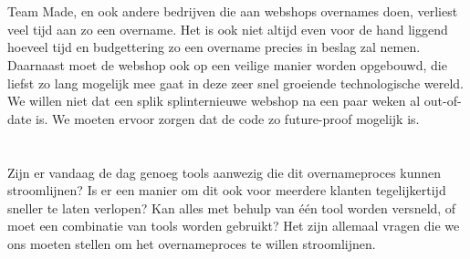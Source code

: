 \section{}%
\label{sec:probleemstelling}


Team Made, en ook andere bedrijven die aan webshops overnames doen, verliest veel tijd aan zo een overname. Het is ook niet altijd even voor de hand liggend hoeveel tijd en budgettering zo een overname precies in beslag zal nemen. Daarnaast moet de webshop ook op een veilige manier worden opgebouwd, die liefst zo lang mogelijk mee gaat in deze zeer snel groeiende technologische wereld. We willen niet dat een splik splinternieuwe webshop na een paar weken al out-of-date is. We moeten ervoor zorgen dat de code zo future-proof mogelijk is.

\section{}%
\label{sec:onderzoeksvraag}


Zijn er vandaag de dag genoeg tools aanwezig die dit overnameproces kunnen stroomlijnen? Is er een manier om dit ook voor meerdere klanten tegelijkertijd sneller te laten verlopen? Kan alles met behulp van één tool worden versneld, of moet een combinatie van tools worden gebruikt? Het zijn allemaal vragen die we ons moeten stellen om het overnameproces te willen stroomlijnen.

